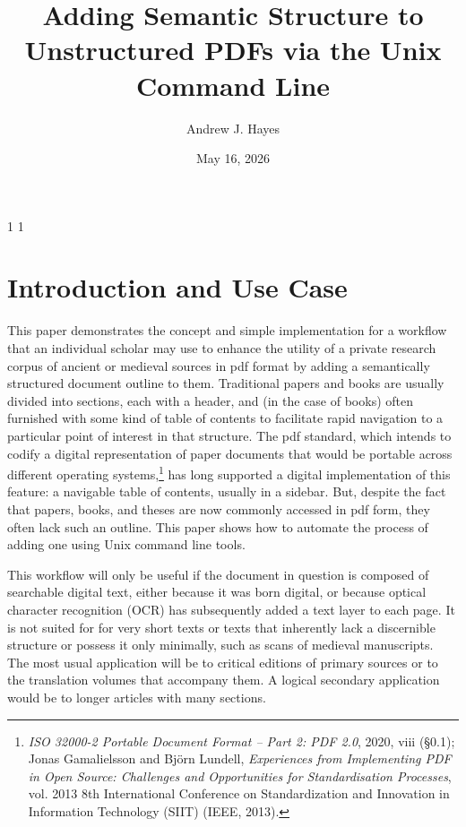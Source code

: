 \documentclass[
  letterpaper,
]{tufte-handout}
\title{Adding Semantic Structure to Unstructured PDFs via the Unix
Command Line}
\author{Andrew J. Hayes}
\date{May 16, 2026}
\begin{document}
\maketitle

\ifdefined\soulregister

\soulregister\MakeTextUppercase{1} \soulregister\MakeTextLowercase{1}
\soulregister{} \fi

\doublespacing

\section{Introduction and Use Case}\label{introduction-and-use-case}

This paper demonstrates the concept and simple implementation for a
workflow that an individual scholar may use to enhance the utility of a
private research corpus of ancient or medieval sources in pdf format by
adding a semantically structured document outline to them. Traditional
papers and books are usually divided into sections, each with a header,
and (in the case of books) often furnished with some kind of table of
contents to facilitate rapid navigation to a particular point of
interest in that structure. The pdf standard, which intends to codify a
digital representation of paper documents that would be portable across
different operating systems,\footnote{\emph{ISO 32000-2 Portable
  Document Format -- Part 2: PDF 2.0}, 2020, viii (§0.1); Jonas
  Gamalielsson and Björn Lundell, \emph{Experiences from Implementing
  PDF in Open Source: Challenges and Opportunities for Standardisation
  Processes}, vol. 2013 8th International Conference on Standardization
  and Innovation in Information Technology (SIIT) (IEEE, 2013).} has
long supported a digital implementation of this feature: a navigable
table of contents, usually in a sidebar. But, despite the fact that
papers, books, and theses are now commonly accessed in pdf form, they
often lack such an outline. This paper shows how to automate the process
of adding one using Unix command line tools.

This workflow will only be useful if the document in question is
composed of searchable digital text, either because it was born digital,
or because optical character recognition (OCR) has subsequently added a
text layer to each page. It is not suited for for very short texts or
texts that inherently lack a discernible structure or possess it only
minimally, such as scans of medieval manuscripts. The most usual
application will be to critical editions of primary sources or to the
translation volumes that accompany them. A logical secondary application
would be to longer articles with many sections.
\end{document}
